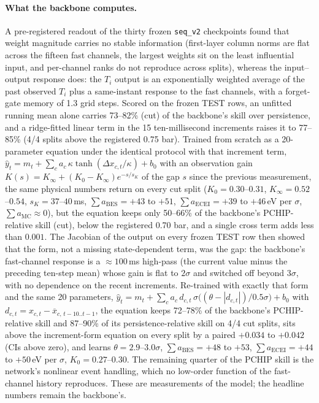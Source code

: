 \documentclass[10pt]{article}
\newcommand{\Ti}{\ensuremath{T_i}}
\newcommand{\seqv}{\texttt{seq\_v2}}
\begin{document}
\paragraph{What the backbone computes.}
A pre-registered readout of the thirty frozen \seqv{} checkpoints found that weight
magnitude carries no stable information (first-layer column norms are flat across the
fifteen fast channels, the largest weights sit on the least influential input, and
per-channel ranks do not reproduce across splits), whereas the input--output response
does: the \Ti{} output is an exponentially weighted average of the past observed
\Ti{} plus a same-instant response to the fast channels, with a forget-gate memory of
1.3 grid steps. Scored on the frozen TEST rows, an unfitted running mean alone carries
73--82\% (cut) of the backbone's skill over persistence, and a ridge-fitted linear term
in the 15 ten-millisecond increments raises it to 77--85\% (4/4 splits above the
registered 0.75 bar). Trained from scratch as a 20-parameter equation under the
identical protocol with that increment term, $\hat y_t = m_t + \sum_c a_c\,\kappa
\tanh(\Delta x_{c,t}/\kappa) + b_0$ with an observation gain $K(s) = K_\infty + (K_0 -
K_\infty)e^{-s/s_K}$ of the gap $s$ since the previous measurement, the same physical
numbers return on every cut split ($K_0 = 0.30$--$0.31$, $K_\infty = 0.52$--$0.54$,
$s_K = 37$--$40$\,ms, $\sum a_{\mathrm{BES}} = +43$ to $+51$, $\sum a_{\mathrm{ECEI}} =
+39$ to $+46$\,eV per $\sigma$, $\sum a_{\mathrm{MC}} \approx 0$), but the equation keeps
only 50--66\% of the backbone's PCHIP-relative skill (cut), below the registered 0.70 bar,
and a single cross term adds less than $0.001$. The Jacobian of the output on every
frozen TEST row then showed that the form, not a missing state-dependent term, was the
gap: the backbone's fast-channel response is a ${\approx}100$\,ms high-pass (the current
value minus the preceding ten-step mean) whose gain is flat to $2\sigma$ and switched off
beyond $3\sigma$, with no dependence on the recent increments. Re-trained with exactly
that form and the same 20 parameters, $\hat y_t = m_t + \sum_c a_c\,d_{c,t}\,
\sigma\!\big((\theta - |d_{c,t}|)/0.5\sigma\big) + b_0$ with $d_{c,t} = x_{c,t} -
\overline{x}_{c,\,t-10..t-1}$, the equation keeps 72--78\% of the backbone's
PCHIP-relative skill and 87--90\% of its persistence-relative skill on 4/4 cut splits,
sits above the increment-form equation on every split by a paired $+0.034$ to $+0.042$
(CIs above zero), and learns $\theta = 2.9$--$3.0\sigma$, $\sum a_{\mathrm{BES}} = +48$ to $+53$,
$\sum a_{\mathrm{ECEI}} = +44$ to $+50$\,eV per $\sigma$, $K_0 = 0.27$--$0.30$. The
remaining quarter of the PCHIP skill is the network's nonlinear event handling, which no
low-order function of the fast-channel history reproduces. These are measurements of the
model; the headline numbers remain the backbone's.
\end{document}
